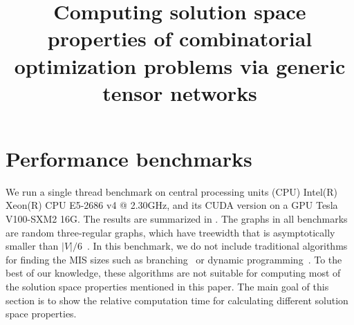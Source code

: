 \documentclass[review,supplement,onefignum,onetabnum]{siamart190516}
\title{Computing solution space properties of combinatorial optimization problems via generic tensor networks}
\begin{document}
\maketitle

\section{Performance benchmarks}\label{sec:benchmark}
We run a single thread benchmark on central processing units (CPU) Intel(R) Xeon(R) CPU E5-2686 v4 @ 2.30GHz, and its CUDA version on a GPU Tesla V100-SXM2 16G.
The results are summarized in .
The graphs in all benchmarks are random three-regular graphs, which have treewidth that is asymptotically smaller than $|V|/6$~\cite{Fomin2006}.
In this benchmark, we do not include traditional algorithms for finding the MIS sizes such as branching~\cite{Tarjan1977, Robson1986} or dynamic programming~\cite{Courcelle1990, Fomin2013}.
To the best of our knowledge, these algorithms are not suitable for computing most of the solution space properties mentioned in this paper.
The main goal of this section is to show the relative computation time for calculating different solution space properties.
\end{document}

